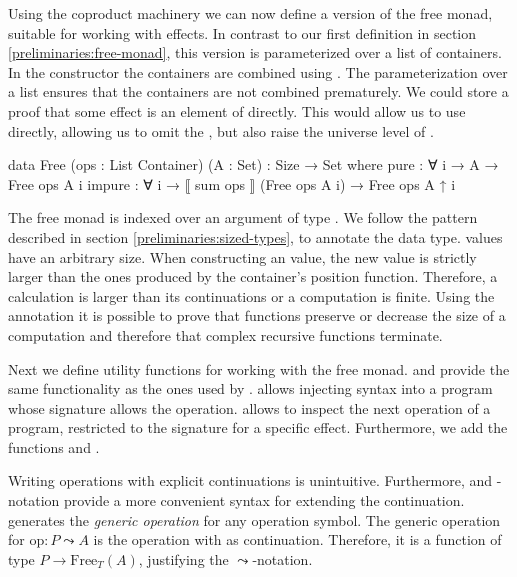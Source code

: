 Using the coproduct machinery we can now define a version of the free monad,
suitable for working with effects.
In contrast to our first definition in section \ref{preliminaries:free-monad},
this version is parameterized over a list of containers.
In the  constructor the containers are combined
using .
The parameterization over a list ensures that the containers are not combined
prematurely.
We could store a proof that some effect  is an element of
 directly.
This would allow us to use  directly, allowing us to omit the
, but also raise the universe level of .

\begin{code}
data Free (ops : List Container) (A : Set) : {Size} → Set where
  pure    : ∀ {i} → A → Free ops A {i}
  impure  : ∀ {i} → ⟦ sum ops ⟧ (Free ops A {i}) → Free ops A {↑ i}
\end{code}
The free monad is indexed over an argument of type .
We follow the pattern described in section \ref{preliminaries:sized-types}, to
annotate the data type.
 values have an arbitrary size.
When constructing an  value, the new value is
strictly larger than the ones produced by the container's position function.
Therefore, a calculation is larger than its continuations or a computation is
finite.
Using the annotation it is possible to prove that functions preserve or decrease
the size of a computation and therefore that complex recursive functions
terminate.

Next we define utility functions for working with the free monad.
 and  provide the same functionality as the
ones used by \textcite{DBLP:conf/haskell/WuSH14}.
 allows injecting syntax into a program whose signature allows
the operation.
 allows to inspect the next operation of a
program, restricted to the signature for a specific effect.
Furthermore, we add the functions  and .

Writing operations with explicit continuations is unintuitive.
Furthermore, \AgdaFunction{>>=} and -notation provide a more
convenient syntax for extending the continuation.
 generates the \textit{generic operation} for any operation
symbol.
The generic operation for $\mathrm{op} : P \leadsto A$ is the operation with
 as continuation.
Therefore, it is a function of type $P \rightarrow \mathrm{Free}_T(A)$,
justifying the $\leadsto$-notation.

